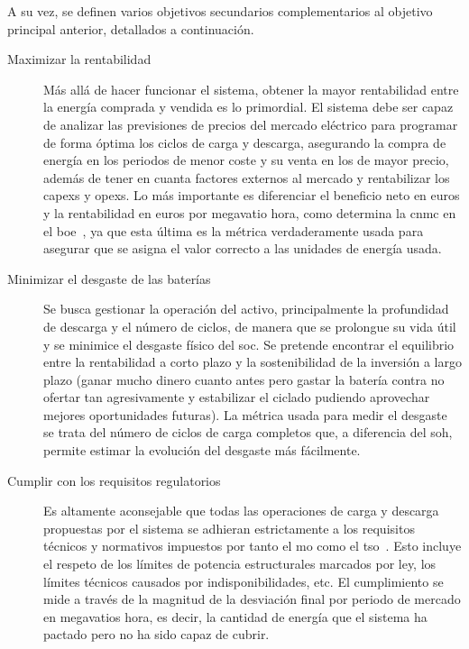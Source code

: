 A su vez, se definen varios objetivos secundarios complementarios al objetivo principal anterior, detallados a continuación.

\begin{description}

  \item[Maximizar la rentabilidad] Más allá de hacer funcionar el sistema, obtener la mayor rentabilidad entre la energía comprada y vendida es lo primordial. El sistema debe ser capaz de analizar las previsiones de precios del mercado eléctrico para programar de forma óptima los ciclos de carga y descarga, asegurando la compra de energía en los periodos de menor coste y su venta en los de mayor precio, además de tener en cuanta factores externos al mercado y rentabilizar los \glspl{capex} y \glspl{opex}. Lo más importante es diferenciar el beneficio neto en euros y la rentabilidad en euros por megavatio hora, como determina la \gls{cnmc} en el \gls{boe}~\cite{cnmc2025resolucion}, ya que esta última es la métrica verdaderamente usada para asegurar que se asigna el valor correcto a las unidades de energía usada.

  \item[Minimizar el desgaste de las baterías] Se busca gestionar la operación del activo, principalmente la profundidad de descarga y el número de ciclos, de manera que se prolongue su vida útil y se minimice el desgaste físico del \gls{soc}. Se pretende encontrar el equilibrio entre la rentabilidad a corto plazo y la sostenibilidad de la inversión a largo plazo (ganar mucho dinero cuanto antes pero gastar la batería contra no ofertar tan agresivamente y estabilizar el ciclado pudiendo aprovechar mejores oportunidades futuras). La métrica usada para medir el desgaste se trata del número de ciclos de carga completos que, a diferencia del \gls{soh}, permite estimar la evolución del desgaste más fácilmente.

  \item[Cumplir con los requisitos regulatorios] Es altamente aconsejable que todas las operaciones de carga y descarga propuestas por el sistema se adhieran estrictamente a los requisitos técnicos y normativos impuestos por tanto el \gls{mo} como el \gls{tso}~\cite{crespo2004resolucion}. Esto incluye el respeto de los límites de potencia estructurales marcados por ley, los límites técnicos causados por indisponibilidades, etc. El cumplimiento se mide a través de la magnitud de la desviación final por periodo de mercado en megavatios hora, es decir, la cantidad de energía que el sistema ha pactado pero no ha sido capaz de cubrir.


\end{description}

